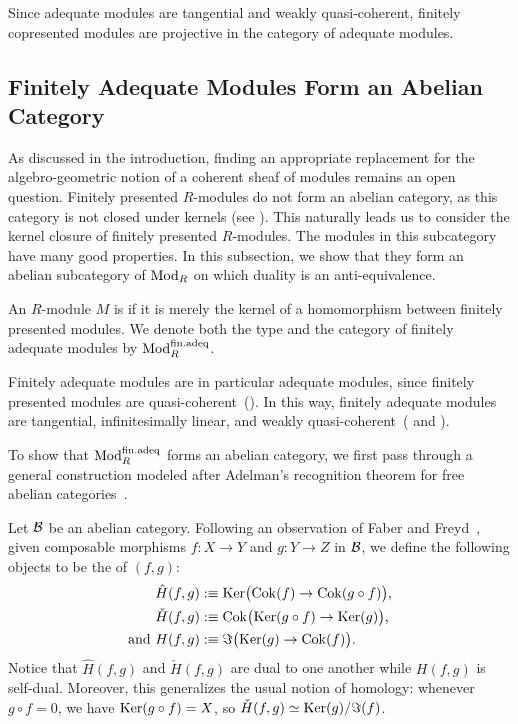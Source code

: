 \begin{remark}\label{rem:fcp-is-proj}
  Since adequate modules are tangential and weakly quasi-coherent, finitely copresented modules are projective in the category of adequate modules.
\end{remark}

\subsection{Finitely Adequate Modules Form an Abelian Category}
\label{ss:finad-abelian}

As discussed in the introduction, finding an appropriate replacement for the algebro-geometric notion of a coherent sheaf of modules remains an open question.
Finitely presented $R$-modules do not form an abelian category, as this category is not closed under kernels (see ).
This naturally leads us to consider the kernel closure of finitely presented $R$-modules.
The modules in this subcategory have many good properties.
In this subsection, we show that they form an abelian subcategory of $\textup{Mod}_{R}$
on which duality is an anti-equivalence.

\begin{definition}\label{def:fin-adeq}
  An $R$-module $M$ is  if it is merely the kernel of a homomorphism between finitely presented modules.
  We denote both the type and the category of finitely adequate modules by $\finadeq$\index{$\finadeq$}.
\end{definition}

Finitely adequate modules are in particular adequate modules, since finitely presented modules are quasi-coherent~().
In this way, finitely adequate modules are tangential, infinitesimally linear, and weakly quasi-coherent~( and ).

To show that $\finadeq$ forms an abelian category, we first pass through a general construction modeled after Adelman's recognition theorem for free abelian categories~\cite[Theorem 1.15]{adelman-construction}.

Let $\mathcal{B}$ be an abelian category.
Following an observation of Faber and Freyd~\cite[Section 6]{faberFillinTheorems1966}, given composable morphisms $f : X \to Y$ and $g : Y \to Z$ in $\mathcal{B}$, we define the following objects to be the  of $(f,g)$:
\begin{align*}
  \hat{H}(f,g) & :\equiv \operatorname{Ker}\bigl(\operatorname{Cok} (f) \to \operatorname{Cok}(g \circ f)\bigr)\text{,} \\
  \check{H}(f,g) & :\equiv \operatorname{Cok}\bigl(\operatorname{Ker} (g \circ f) \rightarrow \operatorname{Ker} (g)\bigr)\text{,} \\
  \text{and } H(f,g) & :\equiv \Im\bigl(\operatorname{Ker} (g) \to \operatorname{Cok} (f)\bigr)\text{.}
\end{align*}
Notice that $\hat{H}(f,g)$ and $\check{H}(f,g)$ are dual to one another while $H(f,g)$ is self-dual.
Moreover, this generalizes the usual notion of homology: whenever $g \circ f = 0$, we have $\operatorname{Ker}(g \circ f) = X$, so $\check{H}(f,g) \simeq \operatorname{Ker} (g)/\Im (f)$.

